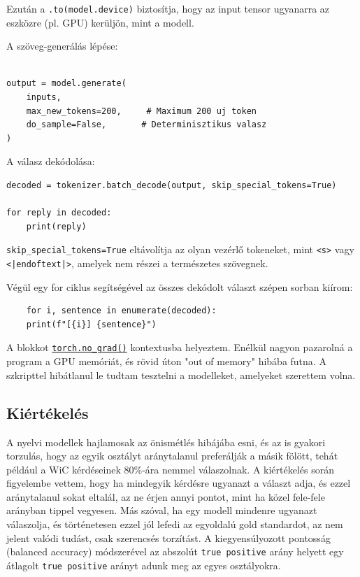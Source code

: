\documentclass[12pt]{report}
\theoremstyle{definition}
\begin{document}
Ezután a \texttt{.to(model.device)} biztosítja, hogy az input tensor ugyanarra
az eszközre (pl. GPU) kerüljön, mint a modell.

A szöveg-generálás lépése:
\begin{lstlisting}

output = model.generate(
    inputs,
    max_new_tokens=200,     # Maximum 200 uj token
    do_sample=False,       # Determinisztikus valasz
)
\end{lstlisting}

A válasz dekódolása:
\begin{lstlisting}
decoded = tokenizer.batch_decode(output, skip_special_tokens=True)

for reply in decoded:
    print(reply)
\end{lstlisting}

\texttt{skip\_special\_tokens=True} eltávolítja az olyan vezérlő tokeneket,
mint \texttt{<s>} vagy \texttt{<|endoftext|>}, amelyek nem részei a természetes szövegnek.

Végül egy for ciklus segítségével az összes dekódolt választ szépen sorban kiírom:

\begin{lstlisting}
    for i, sentence in enumerate(decoded):
    print(f"[{i}] {sentence}")
\end{lstlisting}



A blokkot \texttt{\href{https://pytorch.org/docs/stable/generated/torch.no_grad.html}{torch.no\_grad()}} kontextusba helyeztem. Enélkül nagyon pazarolná a program a GPU memóriát, és rövid úton "out of memory" hibába futna.
A szkripttel hibátlanul le tudtam tesztelni a modelleket, amelyeket szerettem volna.

\subsection{Kiértékelés}
A nyelvi modellek hajlamosak az önismétlés hibájába esni, és az is gyakori torzulás, hogy az egyik osztályt aránytalanul preferálják a másik fölött, tehát például a WiC kérdéseinek 80\%-ára nemmel válaszolnak. A kiértékelés során figyelembe vettem, hogy ha mindegyik kérdésre ugyanazt a választ adja, és ezzel aránytalanul sokat eltalál, az ne érjen annyi pontot, mint ha közel fele-fele arányban tippel vegyesen. Más szóval, ha egy modell mindenre ugyanazt válaszolja, és történetesen ezzel jól lefedi az egyoldalú gold standardot, az nem jelent valódi tudást, csak szerencsés torzítást.
A kiegyensúlyozott pontosság (balanced accuracy) módszerével az abszolút \texttt{true positive} arány helyett egy átlagolt \texttt{true positive} arányt adunk meg az egyes osztályokra.
\end{document}
